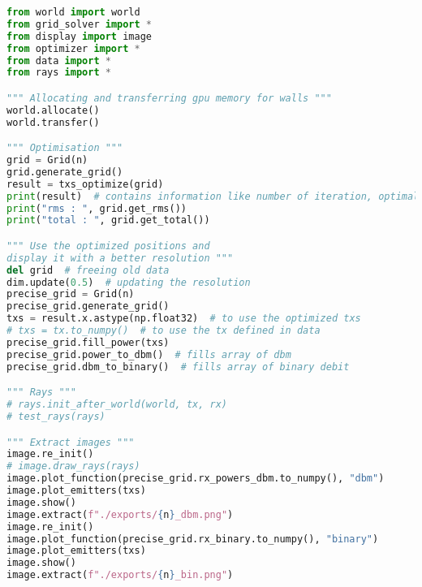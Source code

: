\begin{lstlisting}[language=python]
from world import world
from grid_solver import *
from display import image
from optimizer import *
from data import *
from rays import *

""" Allocating and transferring gpu memory for walls """
world.allocate()
world.transfer()

""" Optimisation """
grid = Grid(n)
grid.generate_grid()
result = txs_optimize(grid)
print(result)  # contains information like number of iteration, optimal position and cost function value
print("rms : ", grid.get_rms())
print("total : ", grid.get_total())

""" Use the optimized positions and
display it with a better resolution """
del grid  # freeing old data
dim.update(0.5)  # updating the resolution
precise_grid = Grid(n)
precise_grid.generate_grid()
txs = result.x.astype(np.float32)  # to use the optimized txs
# txs = tx.to_numpy()  # to use the tx defined in data
precise_grid.fill_power(txs)
precise_grid.power_to_dbm()  # fills array of dbm
precise_grid.dbm_to_binary()  # fills array of binary debit

""" Rays """
# rays.init_after_world(world, tx, rx)
# test_rays(rays)

""" Extract images """
image.re_init()
# image.draw_rays(rays)
image.plot_function(precise_grid.rx_powers_dbm.to_numpy(), "dbm")
image.plot_emitters(txs)
image.show()
image.extract(f"./exports/{n}_dbm.png")
image.re_init()
image.plot_function(precise_grid.rx_binary.to_numpy(), "binary")
image.plot_emitters(txs)
image.show()
image.extract(f"./exports/{n}_bin.png")

\end{lstlisting}
